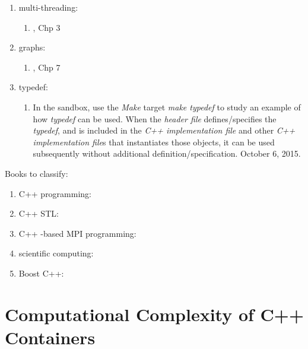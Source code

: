 \begin{enumerate}
\begin{enumerate}
	\end{enumerate}
\item multi-threading: \vspace{-0.3cm}
	\begin{enumerate} \itemsep -2pt
	\item \cite{Schildt2004a}, Chp 3
	\end{enumerate}
\item graphs: \vspace{-0.3cm}
	\begin{enumerate} \itemsep -2pt
	\item \cite{Schildt2004a}, Chp 7
	\end{enumerate}
\item typedef: \vspace{-0.3cm}
	\begin{enumerate} \itemsep -2pt
	\item In the sandbox, use the {\it Make} target {\it make typedef} to study an example of how {\it typedef} can be used. When the {\it header file} defines/specifies the {\it typedef}, and is included in the {\it C++ implementation file} and other {\it C++ implementation file}s that instantiates those objects, it can be used subsequently without additional definition/specification. October 6, 2015.
	\end{enumerate}
\end{enumerate}


Books to classify: \vspace{-0.3cm}
\begin{enumerate} \itemsep -4pt
\item C++ programming: \cite{Horstmann2012,Katupitiya2006,Koenig2000,Pozrikidis2007,Prata2005,Romanik2003,Savitch2009,Scheinerman2006,Schildt1998a,Schildt2003a}
\item C++ STL: \cite{Josuttis2012,Karlsson2006a,Robson2000,HewlettPackardCompanyStaff2014,HewlettPackardCompanyStaff1994,Riesbeck2009,Cline2000,Cline2003,Cline2011}
\item C++ -based MPI programming: \cite{Karniadakis2003}
\item scientific computing: \cite{PittFrancis2012}
\item Boost C++: \cite{Mukherjee2015,Polukhin2013,Schaling2012}
\end{enumerate}


\section{Computational Complexity of C++ Containers}
\label{sec:ComputationalComplexityofCppContainers}


